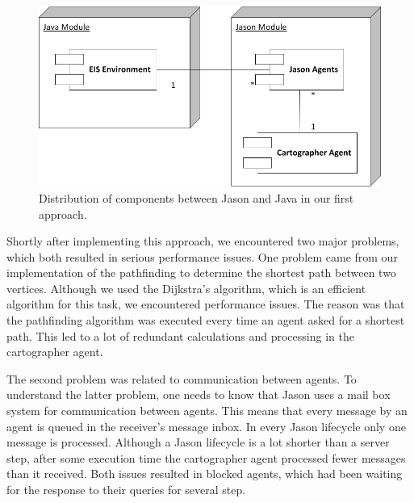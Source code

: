 \begin{figure}
  \centering
  \includegraphics[width=0.7\linewidth]{images/map_comp_1.png}
  \caption{Distribution of components between Jason and Java in our first approach.}
  \label{fig:map:comp1}
\end{figure}

Shortly after implementing this approach, we encountered two major problems, which both resulted in serious performance issues.
One problem came from our implementation of the pathfinding to determine the shortest path between two vertices.
Although we used the Dijkstra's algorithm, which is an efficient algorithm for this task, we encountered performance issues.
The reason was that the pathfinding algorithm was executed every time an agent asked for a shortest path.
This led to a lot of redundant calculations and processing in the cartographer agent.

The second problem was related to communication between agents.
To understand the latter problem, one needs to know that Jason uses a mail box system for communication between agents.
This means that every message by an agent is queued in the receiver's message inbox.
In every Jason lifecycle only one message is processed.
Although a Jason lifecycle is a lot shorter than a server step, after some execution time the cartographer agent processed fewer messages than it received.
Both issues resulted in blocked agents, which had been waiting for the response to their queries for several step.

